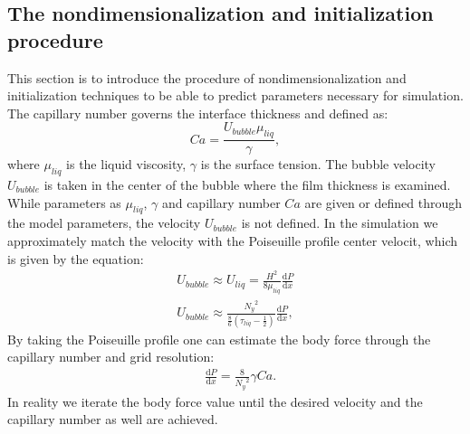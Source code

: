 \documentclass{article}
\begin{document}
\subsection{The nondimensionalization and initialization procedure}
This section is to introduce the procedure of nondimensionalization and
initialization techniques to be able to predict parameters necessary for
simulation. The capillary number governs the interface thickness and defined as:
\begin{equation}
Ca=\frac{U_{bubble} \mu_{liq}}{\gamma},
\end{equation}
where $\mu_{liq}$ is the liquid viscosity, $\gamma$ is the surface tension. The
bubble velocity $U_{bubble}$ is taken in the center of the bubble where the film
thickness is examined. 
While parameters as $\mu_{liq}$, $\gamma$ and capillary number $Ca$ are given
or defined through the model parameters, the velocity $U_{bubble}$ is not
defined. In the simulation we approximately match the velocity with the
Poiseuille profile center velocit, which is given by the equation:
\begin{equation}
\begin{aligned}
U_{bubble} \approx U_{liq}=\frac{H^2}{8
\mu_{liq}}\frac{\mathrm{d}P}{\mathrm{d}x}\\
U_{bubble}\approx
\frac{{N_y}^2}{\frac{8}{6}(\tau_{liq}-\frac{1}{2})}\frac{\mathrm{d}P}{\mathrm{d}
x } ,
\end{aligned}
\end{equation}
By taking the Poiseuille profile one can estimate the body force through the
capillary number and grid resolution:
\begin{equation}
\begin{aligned}
&\frac{\mathrm{d}P}{\mathrm{d}x}=\frac{8}{{N_y}^2}\gamma Ca.
\end{aligned}
\end{equation}
In reality we iterate the body force value
until the desired velocity and the capillary number as well are achieved. 
\end{document}
